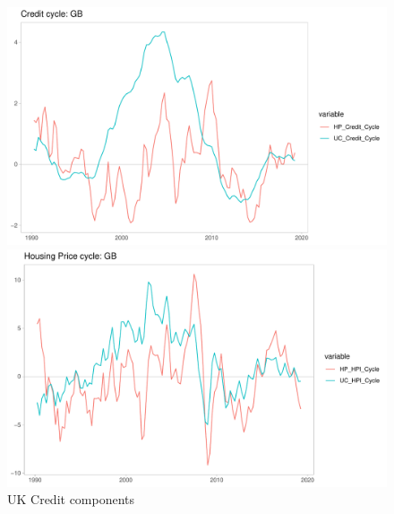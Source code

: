 \documentclass[fleqn]{article}
\begin{document}
\begin{outline}[enumerate]
\begin{figure}[h!]
	\caption{UK Credit components}	
	\centerline{\includegraphics[scale=0.7]{../Output/Graphs/Credit_cycle_GB.pdf}}
	\centerline{\includegraphics[scale=0.7]{../Output/Graphs/HP_cycle_GB.pdf}}
\end{figure}


\end{outline}
\end{document}
